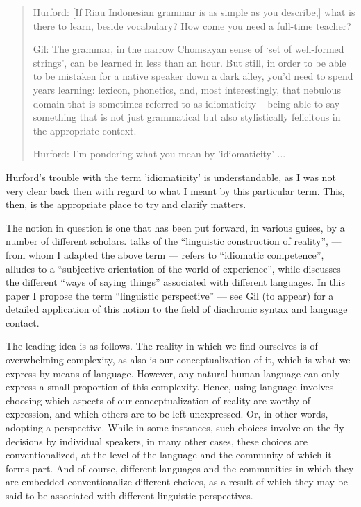 \documentclass[output=paper,colorlinks,citecolor=brown
]{langscibook}
\begin{document}
\begin{quote}
    Hurford:	[If Riau Indonesian grammar is as simple as you describe,] what is there to learn, beside vocabulary? How come you need a full-time teacher?

    Gil: The grammar, in the narrow Chomskyan sense of ‘set of well-formed strings’, can be learned in less than an hour. But still, in order to be able to be mistaken for a native speaker down a dark alley, you’d need to spend years learning: lexicon, phonetics, and, most interestingly, that nebulous domain that is sometimes referred to as idiomaticity – being able to say something that is not just grammatical but also stylistically felicitous in the appropriate context.

    Hurford:	I'm pondering what you mean by 'idiomaticity' ...
\end{quote}

Hurford's trouble with the term 'idiomaticity' is understandable, as I was not very clear back then with regard to what I meant by this particular term.  This, then, is the appropriate place to try and clarify matters.

The notion in question is one that has been put forward, in various guises, by a number of different scholars. \citet{grace1987linguistic} talks of the ``linguistic construction of reality'', \citet{pawlk} — from whom I adapted the above term — refers to ``idiomatic competence'',
\citet[91]{slobin1996thought} alludes to a ``subjective orientation of the world of experience'',
while \citet{ross2001contact} discusses the different ``ways of saying things'' associated with
different languages.  In this paper I propose the term ``linguistic perspective'' — see Gil (to
appear) for a detailed application of this notion to the field of diachronic syntax and language contact.

The leading idea is as follows.  The reality in which we find ourselves is of overwhelming complexity, as also is our conceptualization of it, which is what we express by means of language.  However, any natural human language can only express a small proportion of this complexity.  Hence, using language involves choosing which aspects of our conceptualization of reality are worthy of expression, and which others are to be left unexpressed.  Or, in other words, adopting a perspective.  While in some instances, such choices involve on-the-fly decisions by individual speakers, in many other cases, these choices are conventionalized, at the level of the language and the community of which it forms part.  And of course, different languages and the communities in which they are embedded conventionalize different choices, as a result of which they may be said to be associated with different linguistic perspectives.
\end{document}

